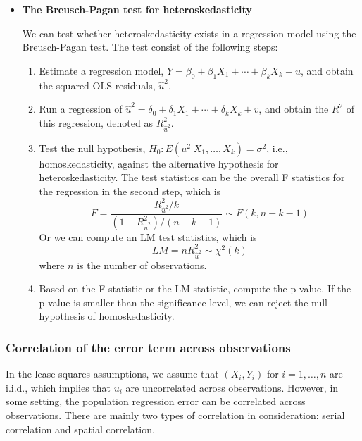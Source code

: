\documentclass[a4paper,11pt]{article}
\begin{document}
\begin{itemize}
\item \textbf{The Breusch-Pagan test for heteroskedasticity}
\label{sec:orgfdc45d0}

We can test whether heteroskedasticity exists in a regression model
using the Breusch-Pagan test. The test consist of the following steps: 
\begin{enumerate}
\item Estimate a regression model, \(Y = \beta_0 + \beta_1 X_1 + \cdots +
   \beta_k X_k + u\), and obtain the squared OLS residuals,
\(\hat{u}^2\).
\item Run a regression of \(\hat{u}^2 = \delta_0 + \delta_1 X_1 + \cdots +
   \delta_k X_k + v\), and obtain the \(R^2\) of this regression, denoted
as \(R^2_{\hat{u}^2}\).
\item Test the null hypothesis, \(H_0: E(u^2 | X_1, \ldots, X_k) =
   \sigma^2\), i.e., homoskedasticity, against the alternative
hypothesis for heteroskedasticity. The test statistics can be the
overall F statistics for the regression in the second step, which
is
\[ F = \frac{R^2_{\hat{u}^2}/k}{(1 - R^2_{\hat{u}^2})/(n-k-1)} \sim
   F(k, n-k-1)\]
Or we can compute an LM test statistics, which is
\[ LM = n R^2_{\hat{u}^2} \sim \chi^2(k) \]
where \(n\) is the number of observations.
\item Based on the F-statistic or the LM statistic, compute the
p-value. If the p-value is smaller than the significance level, we
can reject the null hypothesis of homoskedasticity.
\end{enumerate}
\end{itemize}

\subsubsection*{Correlation of the error term across observations}
\label{sec:orgd1075ec}
In the lease squares assumptions, we assume that \((X_i, Y_i)\) for
\(i=1, \ldots, n\) are i.i.d., which implies that \(u_i\) are uncorrelated
across observations. However, in some setting, the population
regression error can be correlated across observations. There are
mainly two types of correlation in consideration: serial correlation
and spatial correlation. 
\end{document}
